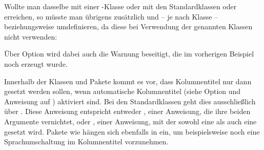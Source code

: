 \begin{Example}
      Wollte man dasselbe mit einer \KOMAScript-Klasse oder mit den
      Standardklassen  oder  erreichen, so müsste
      man übrigens zusätzlich
       und --
      je nach Klasse --
      beziehungsweise %
      umdefinieren, da diese bei Verwendung der genannten Klassen
       nicht verwenden:
    Über Option  wird dabei auch die
    Warnung beseitigt, die im vorherigen Beispiel noch erzeugt wurde.%
    \end{Example}
  \fi%
  \EndIndexGroup
\fi
  

  \begin{Declaration}
  \end{Declaration}
  Innerhalb der Klassen und Pakete kommt es vor, dass Kolumnentitel nur dann
  gesetzt werden sollen, wenn automatische Kolumnentitel (siehe Option
   und Anweisung
   auf
  ) aktiviert sind. Bei
  den Standardklassen geht dies ausschließlich über . Diese
  Anweisung entspricht entweder , einer Anweisung, die ihre
  beiden Argumente vernichtet, oder ,
  einer Anweisung, mit der sowohl eine  als auch eine
   gesetzt wird. Pakete wie  hängen sich
  ebenfalls in  ein, um beispielsweise noch eine
  Sprachumschaltung im Kolumnentitel vorzunehmen.

